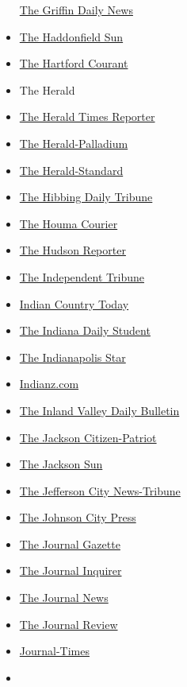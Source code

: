 \begin{itemize}
  \href{https://griffindailynews.com/}{The Griffin Daily News}
\item
  \href{https://thesunpapers.com/haddonfield-sun/}{The Haddonfield Sun}
\item
  \href{https://www.courant.com/}{The Hartford Courant}
\item
  The Herald
\item
  \href{https://www.htrnews.com/}{The Herald Times Reporter}
\item
  \href{https://www.heraldpalladium.com/}{The Herald-Palladium}
\item
  \href{https://www.heraldstandard.com/}{The Herald-Standard}
\item
  \href{https://www.hibbingmn.com/}{The Hibbing Daily Tribune}
\item
  \href{https://www.houmatoday.com/}{The Houma Courier}
\item
  \href{https://hudsonreporter.com/}{The Hudson Reporter}
\item
  \href{https://www.independenttribune.com/}{The Independent Tribune}
\item
  \href{https://indiancountrytoday.com/}{Indian Country Today}
\item
  \href{https://www.idsnews.com/}{The Indiana Daily Student}
\item
  \href{https://www.indystar.com/}{The Indianapolis Star}
\item
  \href{https://www.indianz.com/}{Indianz.com}
\item
  \href{https://www.dailybulletin.com/}{The Inland Valley Daily
  Bulletin}
\item
  \href{https://www.mlive.com/jackson/}{The Jackson Citizen-Patriot}
\item
  \href{https://www.jacksonsun.com/}{The Jackson Sun}
\item
  \href{https://www.newstribune.com/}{The Jefferson City News-Tribune}
\item
  \href{https://www.johnsoncitypress.com/}{The Johnson City Press}
\item
  \href{https://www.journalgazette.net/}{The Journal Gazette}
\item
  \href{https://www.journalinquirer.com/}{The Journal Inquirer}
\item
  \href{https://www.lohud.com/}{The Journal News}
\item
  \href{https://www.journalreview.com/}{The Journal Review}
\item
  \href{https://journaltimes.com/}{Journal-Times}
\item

\end{itemize}
